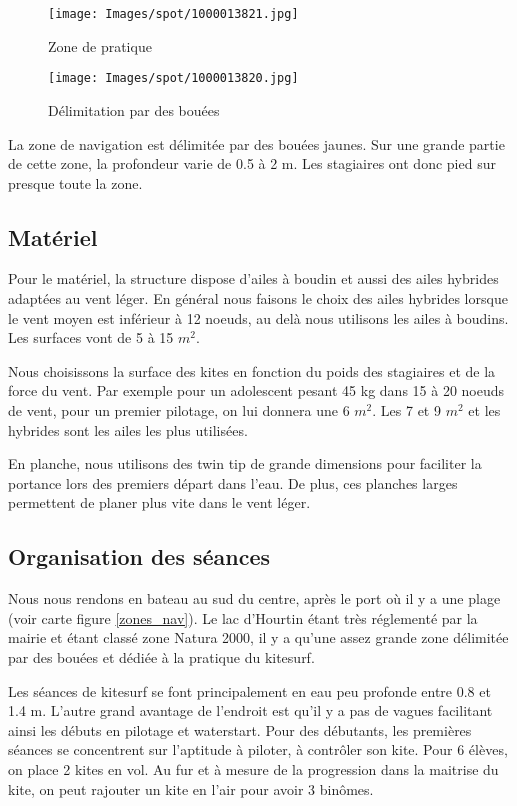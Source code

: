 \documentclass[11pt,a4paper]{report}
\begin{document}
\begin{figure}
\begin{minipage}{0.4\textwidth}
\texttt{[image: Images/spot/1000013821.jpg]} 
\caption{Zone de pratique}
\end{minipage}
\hfill
\begin{minipage}{0.4\textwidth}
\texttt{[image: Images/spot/1000013820.jpg]} 
\caption{Délimitation par des bouées}
\end{minipage}
\end{figure}
La zone de navigation est délimitée par des bouées jaunes.
Sur une grande partie de cette zone, la profondeur varie de 0.5 à 2 m.
Les stagiaires ont donc pied sur presque toute la zone.

\FloatBarrier
\subsection{Matériel}
Pour le matériel, la structure dispose d'ailes à boudin et aussi 
des ailes hybrides adaptées au vent léger. En général nous faisons
le choix des ailes hybrides lorsque le vent moyen est inférieur à
12 noeuds, au delà nous utilisons les ailes à boudins. Les
surfaces vont de 5 à 15 $m^2$. 

Nous choisissons la surface des kites
en fonction du poids des stagiaires et de la force du vent.
Par exemple pour un adolescent pesant 45 kg dans 15 à 20 noeuds
de vent, pour un premier pilotage, on lui donnera une 6 $m^2$.
Les 7 et 9 $m^2$ et les hybrides sont les ailes les plus utilisées.

En planche, nous utilisons des twin tip de grande dimensions 
pour faciliter la portance lors des premiers départ dans l'eau.
De plus, ces planches larges permettent de planer plus vite
dans le vent léger.

\subsection{Organisation des séances}
Nous nous rendons en bateau au sud du centre, après le port o\`u
il y a une plage (voir carte figure \ref{zones_nav}). Le lac 
d'Hourtin étant très réglementé par la mairie et étant classé
zone Natura 2000\cite{natura2000}, 
il y a qu'une assez grande zone délimitée par des bouées et 
dédiée à la pratique du kitesurf.

Les séances de kitesurf se font principalement en eau peu profonde
entre 0.8 et 1.4 m. L'autre grand avantage de l'endroit est
qu'il y a pas de vagues facilitant ainsi les débuts en pilotage
et waterstart.
Pour des débutants, les premières séances se concentrent sur l'aptitude
à piloter, à contrôler son kite. Pour 6 élèves, on place 2 kites en vol.
Au fur et à mesure de la progression dans la maitrise du kite, 
on peut rajouter un kite en l'air pour avoir 3 bin\^omes.
\end{document}
